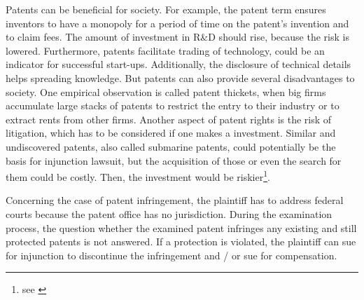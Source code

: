 \documentclass[12pt, a4paper, abstract, parskip]{scrartcl}
\theoremstyle{definition}
\begin{document}
Patents can be beneficial for society. For example, the patent term ensures
inventors to have a monopoly for a period of time on the patent's invention and
to claim fees. The amount of investment in R\&D should rise, because the risk
is lowered. Furthermore, patents facilitate trading of technology, could be an
indicator for successful start-ups. Additionally, the disclosure of technical
details helps spreading knowledge. But patents can also provide several
disadvantages to society. One empirical observation is called patent thickets,
when big firms accumulate large stacks of patents to restrict the entry to
their industry or to extract rents from other firms. Another aspect of patent
rights is the risk of litigation, which has to be considered if one makes a
investment. Similar and undiscovered patents, also called submarine patents,
could potentially be the basis for injunction lawsuit, but the acquisition of
those or even the search for them could be costly. Then, the investment would
be riskier\footnote{see \citet{bessen2011generation}}.

Concerning the case of patent infringement, the plaintiff has to address
federal courts because the patent office has no jurisdiction. During the
examination process, the question whether the examined patent infringes any
existing and still protected patents is not answered. If a protection is
violated, the plaintiff can sue for injunction to discontinue the infringement
and / or sue for compensation.
\end{document}
